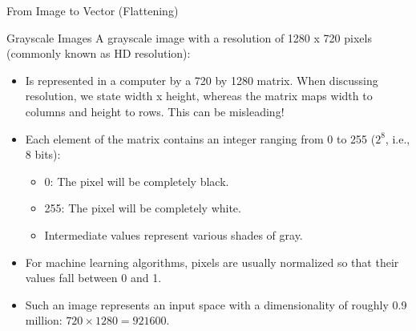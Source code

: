 \begin{frame}{From Image to Vector (Flattening)}
\begin{figure}
	\end{figure}
\end{frame}

\begin{frame}{Grayscale Images}
	A grayscale image with a resolution of 1280 x 720 pixels (commonly known as HD resolution):
	\begin{itemize}
		\item Is represented in a computer by a 720 by 1280 matrix. When discussing resolution, we state width x height, whereas the matrix maps width to columns and height to rows. This can be misleading!
		\item Each element of the matrix contains an integer ranging from 0 to 255 ($2^8$, i.e., 8 bits):
		\begin{itemize}
			\item 0: The pixel will be completely black.
			\item 255: The pixel will be completely white.
			\item Intermediate values represent various shades of gray.
		\end{itemize}
		\item For machine learning algorithms, pixels are usually normalized so that their values fall between 0 and 1.
		\item Such an image represents an input space with a dimensionality of roughly 0.9 million: $720 \times 1280 = 921600$.
	\end{itemize}
\end{frame}

